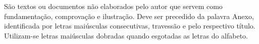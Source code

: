 \begin{center}
	\label{Anexo A}
\end{center}

São textos ou documentos não elaborados pelo autor que servem como fundamentação, comprovação e ilustração. Deve ser precedido da palavra Anexo, identificada por letras maiúsculas consecutivas, travessão e pelo respectivo título. Utilizam-se letras maiúsculas dobradas quando esgotadas as letras do alfabeto.


\clearpage